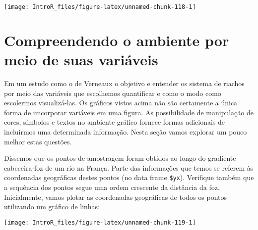 \documentclass[
]{book}
\newenvironment{Shaded}{\begin{snugshade}}{\end{snugshade}}
\newcommand{\AttributeTok}[1]{\textcolor[rgb]{0.77,0.63,0.00}{#1}}
\newcommand{\DecValTok}[1]{\textcolor[rgb]{0.00,0.00,0.81}{#1}}
\newcommand{\FunctionTok}[1]{\textcolor[rgb]{0.00,0.00,0.00}{#1}}
\newcommand{\NormalTok}[1]{#1}
\newcommand{\SpecialCharTok}[1]{\textcolor[rgb]{0.00,0.00,0.00}{#1}}
\newcommand{\StringTok}[1]{\textcolor[rgb]{0.31,0.60,0.02}{#1}}
\begin{document}
\begin{center}\texttt{[image: IntroR\_files/figure-latex/unnamed-chunk-118-1]} \end{center}

\hypertarget{compreendendo-o-ambiente-por-meio-de-suas-variuxe1veis}{%
\section{Compreendendo o ambiente por meio de suas variáveis}\label{compreendendo-o-ambiente-por-meio-de-suas-variuxe1veis}}

Em um estudo como o de Verneaux \citep{Verneaux1973} o objetivo e entender os sistema de riachos por meio das variáveis que escolhemos quantificar e como o modo como escolermos visualizá-las. Os gráficos vistos acima não são certamente a única forma de imcorporar variáveis em uma figura. As possibilidade de manipulação de cores, símbolos e textos no ambiente gráfico fornece formas adicionais de incluirmos uma determinada informação. Nesta seção vamos explorar um pouco melhor estas questões.

Dissemos que os pontos de amostragem foram obtidos ao longo do gradiente cabeceira-foz de um rio na França. Parte das informações que temos se referem às coordenadas geográficas destes pontos (no data frame \texttt{\$yx}). Verifique também que a sequência dos pontos segue uma ordem crescente da distância da foz. Inicialmente, vamos plotar as coordenadas geográficas de todos os pontos utilizando um gráfico de linhas:

\begin{Shaded}
\end{Shaded}

\begin{center}\texttt{[image: IntroR\_files/figure-latex/unnamed-chunk-119-1]} \end{center}
\end{document}
